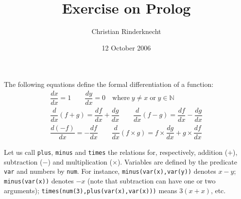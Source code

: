 \documentclass[11pt,a4paper]{article}
\title{Exercise on Prolog}
\author{Christian Rinderknecht}
\date{12 October 2006}
\begin{document}
\maketitle
\thispagestyle{empty}

\noindent The following equations define the formal differentiation of
a function:
\begin{gather*}
\dfrac{dx}{dx}    = 1 \qquad
\dfrac{dy}{dx}    = 0 \quad \text{where} \;y \neq x\; \text{or}\;
                            y \in\mathbb{N}\\
\dfrac{d}{dx}(f + g) = \dfrac{df}{dx} + \dfrac{dg}{dx}
\qquad
\dfrac{d}{dx}(f - g) = \dfrac{df}{dx} - \dfrac{dg}{dx}\\
\dfrac{d(-f)}{dx} = -{\dfrac{df}{dx}}
\qquad
\dfrac{d}{dx}(f \times g) = f \times {\dfrac{dg}{dx}} +
g \times {\dfrac{df}{dx}}
\end{gather*}

\noindent Let us call \texttt{plus}, \texttt{minus} and \texttt{times}
the relations for, respectively, addition (\(+\)), subtraction
(\(-\)) and multiplication (\(\times\)). Variables are defined by the
predicate \texttt{var} and numbers by \texttt{num}. For instance,
\texttt{minus(var(x),var(y))} denotes \(x-y\); \texttt{minus(var(x))}
denotes \(-x\) (note that subtraction can have one or two arguments);
\texttt{times(num(3),plus(var(x),var(x)))} means \(3(x + x)\), etc.



\end{document}
